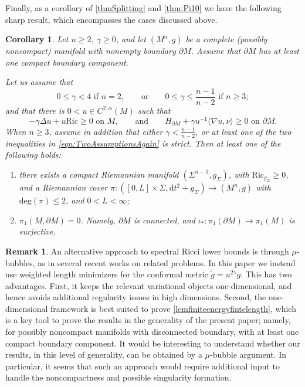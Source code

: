 \documentclass[12pt,a4paper,reqno]{amsart}
\newtheorem{corollary}{Corollary}
\theoremstyle{definition}
\newtheorem{remark}{Remark}
\renewcommand{\leq}{\leqslant}
\renewcommand{\geq}{\geqslant}
\begin{document}
\smallskip
Finally, as a corollary of \cref{thmSplitting} and \cref{thm:Pi10} we have the following sharp result, which encompasses the cases discussed above. 
\begin{corollary}\label{thm:RigidityOrPi1Zero}
    Let $n\geq 2$, $\gamma\geq 0$, and let $(M^n,g)$ be a complete (possibly noncompact) manifold with nonempty boundary $\partial M$. Assume that $\partial M$ has at least one compact boundary component.

    Let us assume that
    \begin{equation}\label{eqn:ThresholdGamma}
    0\leq \gamma < 4\,\, \text{if $n=2$}, \qquad \text{or} \qquad  0\leq \gamma\leq \frac{n-1}{n-2}\,\, \text{if $n\geq 3$};
    \end{equation}
    and that there is $0<u\in C^{2,\alpha}(M)$ such that 
        \begin{equation}\label{eqn:TwoAssumptionsAgain}
        -\gamma\Delta u+u\mathrm{Ric}\geq 0\,\, \text{on $M$}, \qquad \text{and} \qquad H_{\partial M}+\gamma u^{-1}\langle \nabla u,\nu\rangle \geq 0\,\, \text{on $\partial M$}.
        \end{equation}
    When $n\geq3$, assume in addition that either
$\gamma<\frac{n-1}{n-2}$, or at least one of the two inequalities in
\eqref{eqn:TwoAssumptionsAgain} is strict. Then at least one of the following holds:
\begin{enumerate}
    \item there exists a compact Riemannian manifold $(\Sigma^{n-1},g_\Sigma)$, with $\mathrm{Ric}_{g_\Sigma}\geq 0$, and a Riemannian cover $\pi:([0,L]\times\Sigma,\mathrm{d}t^2+g_{\Sigma})\to (M^n,g)$ with $\mathrm{deg}(\pi)\leq 2$, and $0<L<\infty$;
    \item $\pi_1(M,\partial M)=0$. Namely, $\partial M$ is connected, and $\iota_*:\pi_1(\partial M)\to\pi_1(M)$ is surjective.
    \end{enumerate}
\end{corollary}
\begin{remark}
An alternative approach to spectral Ricci lower bounds is through
$\mu$-bubbles, as in several recent works on related problems. In this paper we instead use weighted length minimizers for the conformal metric $\widetilde g=u^{2\gamma}g$. This has two advantages. First, it keeps the relevant variational objects one-dimensional,
and hence avoids additional regularity issues in high dimensions. Second, the one-dimensional framework
is best suited to prove \cref{lemfiniteenergyfintelength}, which is a key tool to prove the results in the generality of the present paper; namely, for possibly noncompact manifolds with disconnected boundary, with at least one compact boundary component. It would be interesting to understand whether our results, in this level of generality, can be
obtained by a $\mu$-bubble argument. In particular, it seems that such an
approach would require additional input to handle the noncompactness and possible singularity formation.
\end{remark}
\smallskip
\end{document}
